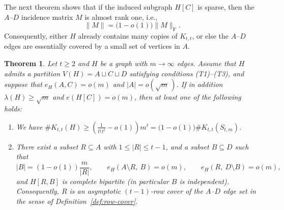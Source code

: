 \documentclass[11pt]{article}
\newtheorem{theorem}{Theorem}[section]
\theoremstyle{definition}
\theoremstyle{plain}
\newcommand{\Ktt}{K_{t,t}}
\begin{document}
The next theorem shows that if the induced subgraph $H[C]$ is sparse, then the $A$--$D$ incidence matrix \(M\) is almost rank one, i.e.,
\[
        \|M\| =\bigl(1- o(1) \bigr) \|M\|_{\mathrm{F}}.
\]
Consequently, either $H$ already
contains many copies of $\Ktt$, or else the $A$--$D$ edges are essentially covered by a small set of vertices in $A$.

\begin{theorem} \label{thm:sparseC-rowcover}
Let $t\ge 2$ and $H$ be a graph with $m \to\infty$ edges. 
Assume that $H$ admits a partition $V(H)=A\sqcup C\sqcup D$ satisfying conditions \textup{(T1)}--\textup{(T3)},
and suppose that $e_H(A,C)=o(m)$ and  $|A|=o(\sqrt{m}\,)$. 
If in addition $\lambda (H)\ge \sqrt{m}$ and  $e(H[C])=o(m)$, 
then at least one of the following holds:
\begin{enumerate}
  \item[\rm(i)] We have $\texttt{\#}\Ktt(H)
     \ge 
    \left(\frac{1}{t!\,t^t}-o(1)\right) m^t 
    =\big( 1-o(1) \big)\texttt{\#}K_{t,t}(S_{t,m}).$

  \item[\rm(ii)]  There exist a subset $R\subseteq A$ with $1\le |R|\le t-1$, and a subset $B\subseteq D$ such that
  \[
    |B|=(1-o(1))\frac{m}{|R|},
    \qquad
    e_H(A\setminus R,\ B)=o(m),
    \qquad
    e_H(R,\ D\setminus B)=o(m),
  \]
  and $H[R,B]$ is complete bipartite (in particular $B$ is independent).
  Consequently, $R$ is an asymptotic $(t\!-\!1)$-row cover of the $A$--$D$ edge set in the sense of Definition~\ref{def:row-cover}.
\end{enumerate} 
\end{theorem}
\end{document}
